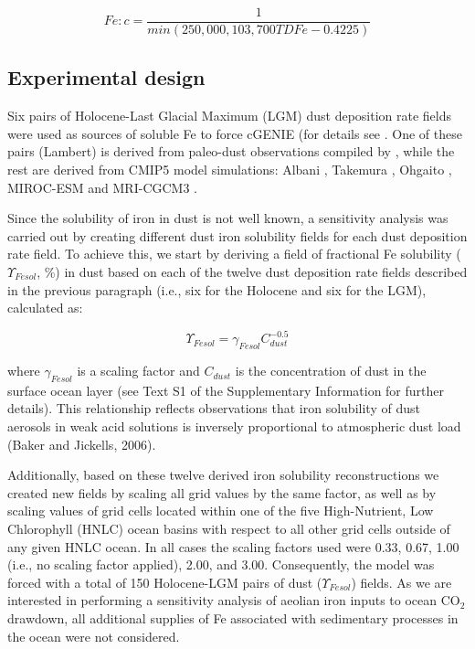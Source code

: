 \begin{linenomath*}
    \begin{equation}
Fe:c=\frac{1}{min(250,000,103,700 TDFe-0.4225)}
    \end{equation}
\end{linenomath*}

\subsection{Experimental design}

Six pairs of Holocene-Last Glacial Maximum (LGM) dust deposition rate fields were used as sources of soluble Fe to force cGENIE (for details see . One of these pairs (Lambert) is derived from paleo-dust observations compiled by , while the rest are derived from CMIP5 model simulations: Albani \cite{albani2014improved}, Takemura \cite{takemura2009simulation}, Ohgaito \cite{ohgaito2018effect}, MIROC-ESM \cite{sueyoshi2013set} and MRI-CGCM3 \cite{yukimoto2012new}. 

Since the solubility of iron in dust is not well known, a sensitivity analysis was carried out by creating different dust iron solubility fields for each dust deposition rate field. To achieve this, we start by deriving a field of fractional Fe solubility ($\Upsilon_{Fesol}$, \%) in dust based on each of the twelve dust deposition rate fields described in the previous paragraph (i.e., six for the Holocene and six for the LGM), calculated as: 

\begin{linenomath*}
    \begin{equation}
\Upsilon_{Fesol}= \gamma_{Fesol}C_{dust}^{-0.5}
    \end{equation}
\end{linenomath*}

where $\gamma_{Fesol}$ is a scaling factor and $C_{dust}$ is the concentration of dust in the surface ocean layer (see Text S1 of the Supplementary Information for further details). This relationship reflects observations that iron solubility of dust aerosols in weak acid solutions is inversely proportional to atmospheric dust load (Baker and Jickells, 2006).

Additionally, based on these twelve derived iron solubility reconstructions we created new fields by scaling all grid values by the same factor, as well as by scaling values of grid cells located within one of the five High-Nutrient, Low Chlorophyll (HNLC) ocean basins with respect to all other grid cells outside of any given HNLC ocean. In all cases the scaling factors used were 0.33, 0.67, 1.00 (i.e., no scaling factor applied), 2.00, and 3.00. Consequently, the model was forced with a total of 150 Holocene-LGM pairs of dust ($\Upsilon_{Fesol}$) fields. As we are interested in performing a sensitivity analysis of aeolian iron inputs to ocean CO$_2$ drawdown, all additional supplies of Fe associated with sedimentary processes in the ocean were not considered.

